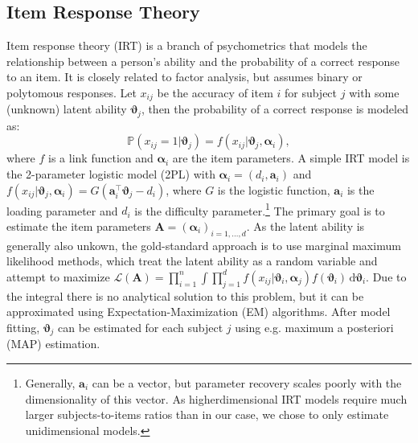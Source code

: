 \documentclass{article}
\begin{document}
\subsection{Item Response Theory}
Item response theory (IRT) is a branch of psychometrics that models the relationship between a person's ability and the probability of a correct response to an item. It is closely related to factor analysis, but assumes binary or polytomous responses. %
Let $x_{ij}$ be the accuracy of item $i$ for subject $j$ with some (unknown) latent ability $\boldsymbol \vartheta_j$, then the probability of a correct response is modeled as:
\begin{equation}
   \mathbb P(x_{ij}=1|\boldsymbol \vartheta_j) = f(x_{ij}|\boldsymbol \vartheta_j, \boldsymbol \alpha_i),
\end{equation}
where $f$ is a link function and $\boldsymbol \alpha_i$ are the item parameters. A simple IRT model is the 2-parameter logistic model (2PL) with $\boldsymbol \alpha_i = (d_i, \mathbf a_i)$ and $f(x_{ij}|\boldsymbol \vartheta_j, \boldsymbol \alpha_i) = G(\mathbf a_i^\top  \boldsymbol \vartheta_j - d_i)$, where $G$ is the logistic function, $\mathbf a_i$ is the loading parameter and $d_i$ is the difficulty parameter.\footnote{Generally, $\mathbf a_i$ can be a vector, but parameter recovery scales poorly with the dimensionality of this vector. As higherdimensional IRT models require much larger subjects-to-items ratios than in our case, we chose to only estimate unidimensional models.} The primary goal is to estimate the item parameters $\mathbf A = (\boldsymbol \alpha_i)_{i = 1, \ldots, d}$. As the latent ability is generally also unkown, the gold-standard approach is to use marginal maximum likelihood methods, which treat the latent ability as a random variable and attempt to maximize $\mathcal L(\mathbf A) = \prod_{i=1}^n \int \prod_{j=1}^d f(x_{ij}|\boldsymbol \vartheta_i, \boldsymbol\alpha_j) f(\boldsymbol \vartheta_i) \, \mathrm d\boldsymbol \vartheta_i$. Due to the integral there is no analytical solution to this problem, but it can be approximated using Expectation-Maximization (EM) algorithms. %
After model fitting, $\boldsymbol \vartheta_j$ can be estimated for each subject $j$ using e.g. maximum a posteriori (MAP) estimation. %
\end{document}
